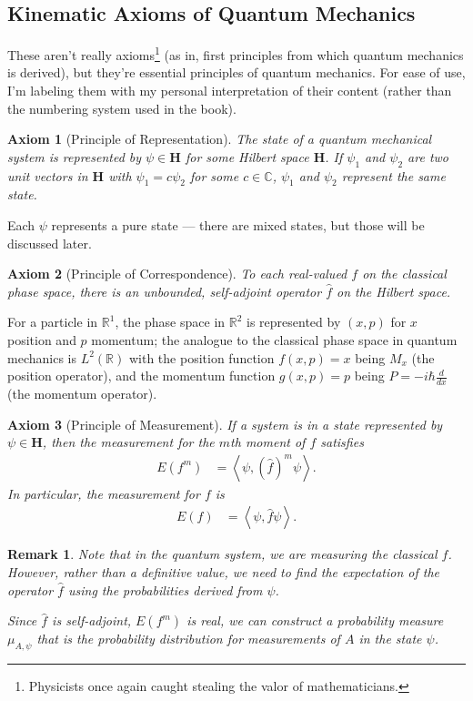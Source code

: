 \documentclass[12pt]{extarticle}
\newtheorem*{remark}{Remark}
\newcommand{\R}{\mathbb{R}}
\newcommand{\C}{\mathbb{C}}
\newcommand{\iprod}[2]{\left\langle #1,#2\right\rangle}
\theoremstyle{plain}
\newtheorem*{axiom}{Axiom}%
\theoremstyle{definition}
\theoremstyle{remark}
\renewcommand{\newline}{\hfill\break}
\begin{document}
  \subsection{Kinematic Axioms of Quantum Mechanics}%
  These aren't really axioms\footnote{Physicists once again caught stealing the valor of mathematicians.} (as in, first principles from which quantum mechanics is derived), but they're essential principles of quantum mechanics. For ease of use, I'm labeling them with my personal interpretation of their content (rather than the numbering system used in the book).
  \begin{axiom}[Principle of Representation]
    The state of a quantum mechanical system is represented by $\psi \in \mathbf{H}$ for some Hilbert space $\mathbf{H}$. If $\psi_1$ and $\psi_2$ are two unit vectors in $\mathbf{H}$ with $\psi_1 = c\psi_2$ for some $c\in \C$, $\psi_1$ and $\psi_2$ represent the same state.
  \end{axiom}
  Each $\psi$ represents a pure state --- there are mixed states, but those will be discussed later.
  \begin{axiom}[Principle of Correspondence]
    To each real-valued $f$ on the classical phase space, there is an unbounded, self-adjoint operator $\hat{f}$ on the Hilbert space.
  \end{axiom}
  For a particle in $\R^{1}$, the phase space in $\R^{2}$ is represented by $(x,p)$ for $x$ position and $p$ momentum; the analogue to the classical phase space in quantum mechanics is $L^{2}(\R)$ with the position function $f(x,p) = x$ being $M_x$ (the position operator), and the momentum function $g(x,p) = p$ being $P = -i\hbar\frac{d}{dx}$ (the momentum operator).
  \begin{axiom}[Principle of Measurement]
    If a system is in a state represented by $\psi \in \mathbf{H}$, then the measurement for the $m$th moment of $f$ satisfies
    \begin{align*}
      E(f^{m}) &= \iprod{\psi}{\left(\hat{f}\right)^m\psi}.
    \end{align*}
    In particular, the measurement for $f$ is
    \begin{align*}
      E(f) &= \iprod{\psi}{\hat{f}\psi}.
    \end{align*}
  \end{axiom}
  \begin{remark}
    Note that in the quantum system, we are measuring the \textit{classical} $f$. However, rather than a definitive value, we need to find the expectation of the operator $\hat{f}$ using the probabilities derived from $\psi$.\newline

    Since $\hat{f}$ is self-adjoint, $E(f^{m})$ is real, we can construct a probability measure $\mu_{A,\psi}$ that is the probability distribution for measurements of $A$ in the state $\psi$.
  \end{remark}
\end{document}
